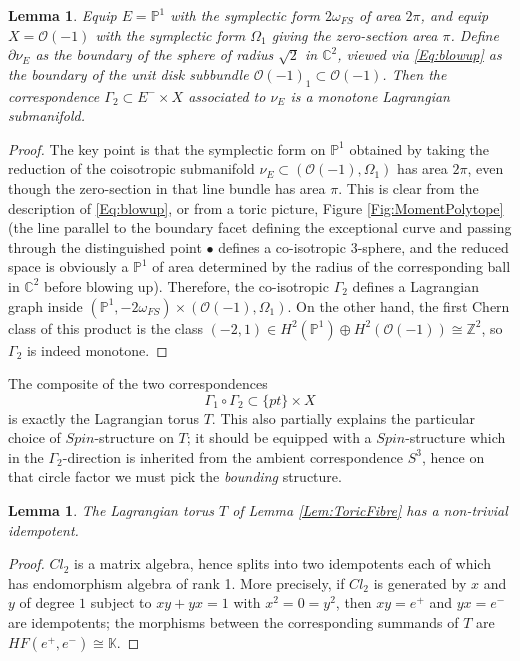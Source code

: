 \documentclass[reqno,10pt]{amsart}
\numberwithin{equation}{section}
\newcommand{\bC}{{\mathbb C}}
\newcommand{\bK}{{\mathbb K}}
\newcommand{\bP}{{\mathbb P}}
\newcommand{\bZ}{{\mathbb Z}}
\newtheorem{Lemma}[thm]{Lemma}
\theoremstyle{remark}
\begin{document}
\begin{Lemma} \label{Lem:CorrsAreLagrangian}
Equip $E=\bP^1$ with the symplectic form $2\omega_{FS}$ of area $2\pi$, and equip $X=\mathcal{O}(-1)$ with the symplectic form $\Omega_{1}$ giving the zero-section area $\pi$.  Define  $\partial \nu_E$ as the boundary of the sphere of radius $\sqrt{2}$ in $\bC^2$, viewed via \eqref{Eq:blowup} as the boundary of the unit disk subbundle $\mathcal{O}(-1)_{1} \subset \mathcal{O}(-1)$. Then the correspondence  $\Gamma_2 \subset E^- \times X$ associated to $\nu_E$ is a monotone Lagrangian submanifold.
\end{Lemma}

\begin{proof}
The key point is that the symplectic form on $\bP^1$ obtained by taking the reduction of the coisotropic submanifold $\nu_E \subset (\mathcal{O}(-1), \Omega_1)$ has area $2\pi$, even though the zero-section in that line bundle has area $\pi$. This is clear from the description of \eqref{Eq:blowup}, or from a toric picture, Figure \ref{Fig:MomentPolytope} (the line parallel to the boundary facet defining the exceptional curve and passing through the distinguished point $\bullet$ defines a co-isotropic 3-sphere, and the reduced space is obviously a $\bP^1$ of area determined by the radius of the corresponding ball in $\bC^2$ before blowing up).   Therefore, the co-isotropic $\Gamma_2$ defines a Lagrangian graph inside $(\bP^1, -2\omega_{FS}) \times (\mathcal{O}(-1), \Omega_1)$. On the other hand, the first Chern class of this product is the class $(-2,1) \in H^2(\bP^1) \oplus H^2(\mathcal{O}(-1)) \cong \bZ^2$, so $\Gamma_2$ is indeed monotone.
\end{proof}
  
   

The composite of the  two correspondences
\[
\Gamma_1 \circ \Gamma_2 \subset \{pt\} \times X
\]
is exactly the Lagrangian torus $T$. This also partially explains the particular choice of $Spin$-structure on $T$; it should be equipped with a $Spin$-structure which in the $\Gamma_2$-direction is inherited from the ambient correspondence $S^3$, hence on that circle factor we must pick the \emph{bounding} structure.  

\begin{Lemma}
The Lagrangian torus $T$ of Lemma \ref{Lem:ToricFibre} has a non-trivial idempotent.
\end{Lemma}

\begin{proof}
 $Cl_2$ is a matrix algebra, hence splits into two  idempotents each of which has endomorphism algebra of rank 1.  More precisely, if $Cl_2$ is generated by $x$ and $y$ of degree $1$ subject to $xy+yx=1$ with $x^2=0=y^2$, then $xy=e^+$ and $yx=e^-$ are idempotents; the morphisms between the corresponding summands of $T$ are $HF(e^+, e^-) \cong \bK$.  
\end{proof}
\end{document}
